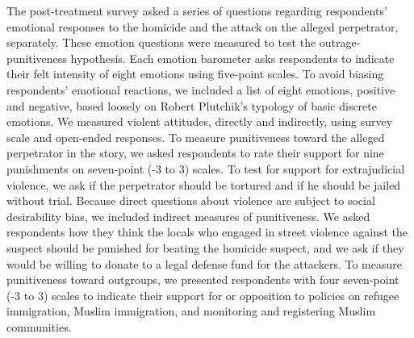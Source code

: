 The post-treatment survey asked a series of questions regarding respondents' emotional responses to the homicide and the attack on the alleged perpetrator, separately. These emotion questions were measured to test the outrage-punitiveness hypothesis. Each emotion barometer asks respondents to indicate their felt intensity of eight emotions using five-point scales. To avoid biasing respondents' emotional reactions, we included a list of eight emotions, positive and negative, based loosely on Robert Plutchik's typology of basic discrete emotions. We measured violent attitudes, directly and indirectly, using survey scale and open-ended responses. To measure punitiveness toward the alleged perpetrator in the story, we asked respondents to rate their support for nine punishments on seven-point (-3 to 3) scales. To test for support for extrajudicial violence, we ask if the perpetrator should be tortured and if he should be jailed without trial. Because direct questions about violence are subject to social desirability bias, we included indirect measures of punitiveness. We asked respondents how they think the locals who engaged in street violence against the suspect should be punished for beating the homicide suspect, and we ask if they would be willing to donate to a legal defense fund for the attackers. To measure punitiveness toward outgroups, we presented respondents with four seven-point (-3 to 3) scales to indicate their support for or opposition to policies on refugee immigration, Muslim immigration, and monitoring and registering Muslim communities.

